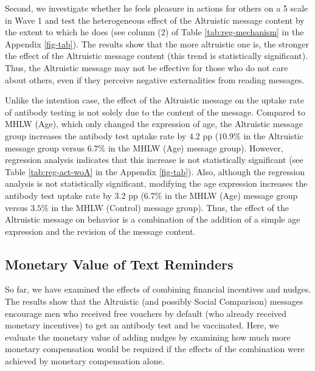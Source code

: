\documentclass[
]{article}
\begin{document}
Second, we investigate whether he feels pleasure in actions for others on a 5 scale in Wave 1 and test the heterogeneous effect of the Altruistic message content by the extent to which he does (see column (2) of Table \ref{tab:reg-mechanism} in the Appendix \ref{fig-tab}). The results show that the more altruistic one is, the stronger the effect of the Altruistic message content (this trend is statistically significant). Thus, the Altruistic message may not be effective for those who do not care about others, even if they perceive negative externalities from reading messages.

Unlike the intention case, the effect of the Altruistic message on the uptake rate of antibody testing is not solely due to the content of the message. Compared to MHLW (Age), which only changed the expression of age, the Altruistic message group increases the antibody test uptake rate by \(4.2\) pp (\(10.9\)\% in the Altruistic message group versus \(6.7\)\% in the MHLW (Age) message group). However, regression analysis indicates that this increase is not statistically significant (see Table \ref{tab:reg-act-woA} in the Appendix \ref{fig-tab}). Also, although the regression analysis is not statistically significant, modifying the age expression increases the antibody test uptake rate by \(3.2\) pp (\(6.7\)\% in the MHLW (Age) message group versus \(3.5\)\% in the MHLW (Control) message group). Thus, the effect of the Altruistic message on behavior is a combination of the addition of a simple age expression and the revision of the message content.

\hypertarget{monetary-value-of-text-reminders}{%
\subsection{Monetary Value of Text Reminders}\label{monetary-value-of-text-reminders}}

So far, we have examined the effects of combining financial incentives and nudges. The results show that the Altruistic (and possibly Social Comparison) messages encourage men who received free vouchers by default (who already received monetary incentives) to get an antibody test and be vaccinated. Here, we evaluate the monetary value of adding nudges by examining how much more monetary compensation would be required if the effects of the combination were achieved by monetary compensation alone.
\end{document}
